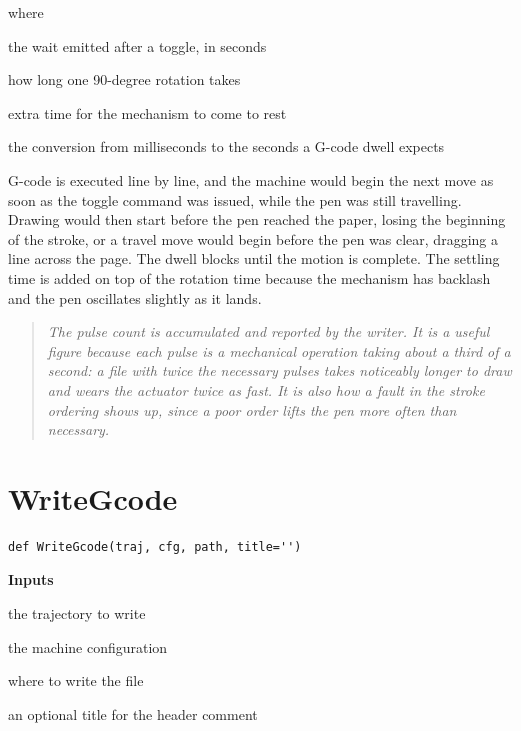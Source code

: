 \noindent where
\begin{description}[leftmargin=2.4em,style=nextline,font=\normalfont\ttfamily]\setlength\itemsep{1pt}
  \item[{$\mathrm{dwell}$}] \normalfont the wait emitted after a toggle, in seconds
  \item[{$\mathrm{penPulseMs}$}] \normalfont how long one 90-degree rotation takes
  \item[{$\mathrm{penSettleMs}$}] \normalfont extra time for the mechanism to come to rest
  \item[{$1000$}] \normalfont the conversion from milliseconds to the seconds a G-code dwell expects
\end{description}
G-code is executed line by line, and the machine would begin the next move as soon as the toggle command was issued, while the pen was still travelling. Drawing would then start before the pen reached the paper, losing the beginning of the stroke, or a travel move would begin before the pen was clear, dragging a line across the page. The dwell blocks until the motion is complete. The settling time is added on top of the rotation time because the mechanism has backlash and the pen oscillates slightly as it lands.


\begin{quote}\small\itshape The pulse count is accumulated and reported by the writer. It is a useful figure because each pulse is a mechanical operation taking about a third of a second: a file with twice the necessary pulses takes noticeably longer to draw and wears the actuator twice as fast. It is also how a fault in the stroke ordering shows up, since a poor order lifts the pen more often than necessary.\end{quote}

\section{WriteGcode}
\begin{lstlisting}[style=sig]
def WriteGcode(traj, cfg, path, title='')
\end{lstlisting}

\noindent\textbf{Inputs}
\begin{description}[leftmargin=2.2em,style=nextline,font=\normalfont\ttfamily]\setlength\itemsep{1pt}
  \item[{traj}] \normalfont the trajectory to write
  \item[{cfg}] \normalfont the machine configuration
  \item[{path}] \normalfont where to write the file
  \item[{title}] \normalfont an optional title for the header comment
\end{description}

